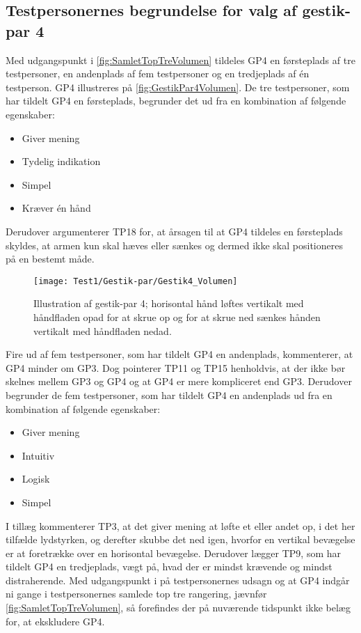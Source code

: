 \subsection{Testpersonernes begrundelse for valg af gestik-par 4}
\label{TestresultaterValgAfGestikkerBegrundelseGP4Volumen}
%
Med udgangspunkt i \autoref{fig:SamletTopTreVolumen} tildeles GP4 en førsteplads af tre testpersoner, en andenplads af fem testpersoner og en tredjeplads af én testperson. GP4 illustreres på \autoref{fig:GestikPar4Volumen}. De tre testpersoner, som har tildelt GP4 en førsteplads, begrunder det ud fra en kombination af følgende egenskaber: 
%
\begin{multicols}{3}
    \begin{itemize}
        \item Giver mening
        \item Tydelig indikation
        \item Simpel
        \item Kræver én hånd
\end{itemize}
\end{multicols}
\noindent
%
Derudover argumenterer TP18 for, at årsagen til at GP4 tildeles en førsteplads skyldes, at armen kun skal hæves eller sænkes og dermed ikke skal positioneres på en bestemt måde.
%
\begin{figure}[H]
	\centering
	\texttt{[image: Test1/Gestik-par/Gestik4\_Volumen]}
	\caption{Illustration af gestik-par 4; horisontal hånd løftes vertikalt med håndfladen opad for at skrue op og for at skrue ned sænkes hånden vertikalt med håndfladen nedad.}
	\label{fig:GestikPar4Volumen}
\end{figure}
\noindent
%
Fire ud af fem testpersoner, som har tildelt GP4 en andenplads, kommenterer, at GP4 minder om GP3. Dog pointerer TP11 og TP15 henholdvis, at der ikke bør skelnes mellem GP3 og GP4 og at GP4 er mere kompliceret end GP3. Derudover begrunder de fem testpersoner, som har tildelt GP4 en andenplads ud fra en kombination af følgende egenskaber: 
%
\begin{multicols}{3}
    \begin{itemize}
        \item Giver mening
        \item Intuitiv
        \item Logisk
        \item Simpel
\end{itemize}
\end{multicols}
\noindent
%
I tillæg kommenterer TP3, at det giver mening at løfte et eller andet op, i det her tilfælde lydstyrken, og derefter skubbe det ned igen, hvorfor en vertikal bevægelse er at foretrække over en horisontal bevægelse. Derudover lægger TP9, som har tildelt GP4 en tredjeplads, vægt på, hvad der er mindst krævende og mindst distraherende.\blankline 
%
Med udgangspunkt i på testpersonernes udsagn og at GP4 indgår ni gange i testpersonernes samlede top tre rangering, jævnfør \autoref{fig:SamletTopTreVolumen}, så forefindes der på nuværende tidspunkt ikke belæg for, at ekskludere GP4.
%

